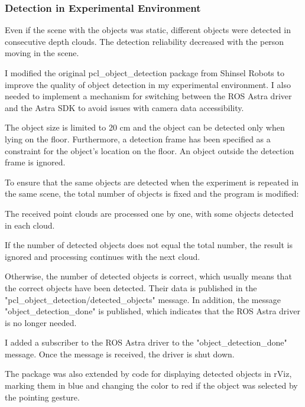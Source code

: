 \subsubsection{Detection in Experimental Environment}
Even if the scene with the objects was static, different objects were detected in consecutive depth clouds. The detection reliability decreased with the person moving in the scene.\par
I modified the original pcl\_object\_detection package from Shinsel Robots to improve the quality of object detection in my experimental environment. I also needed to implement a mechanism for switching between the ROS Astra driver and the Astra SDK to avoid issues with camera data accessibility.\par
The object size is limited to 20 cm and the object can be detected only when lying on the floor. Furthermore, a detection frame has been specified as a constraint for the object's location on the floor. An object outside the detection frame is ignored.\par
To ensure that the same objects are detected when the experiment is repeated in the same scene, the total number of objects is fixed and the program is modified:\par
The received point clouds are processed one by one, with some objects detected in each cloud. \par
If the number of detected objects does not equal the total number, the result is ignored and processing continues with the next cloud.\par
Otherwise, the number of detected objects is correct, which usually means that the correct objects have been detected. Their data is published in the "pcl\_object\_detection/detected\_objects" message. In addition, the message "object\_detection\_done" is published, which indicates that the ROS Astra driver is no longer needed.\par 
I added a subscriber to the ROS Astra driver to the "object\_detection\_done" message. Once the message is received, the driver is shut down.\par

The package was also extended by code for displaying detected objects in rViz, marking them in blue and changing the color to red if the object was selected by the  pointing gesture.\par

